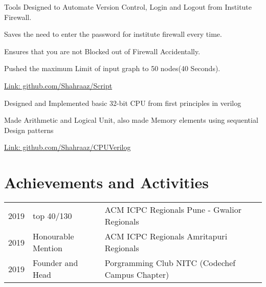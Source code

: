 \documentclass[]{deedy-resume-openfont}
\begin{document}
\begin{minipage}[t]{0.66\textwidth}
\vspace{\topsep} %
\begin{tightemize}
\item Tools Designed to Automate Version Control, Login and Logout from Institute Firewall.
\item Saves the need to enter the password for institute firewall every time.
\item Ensures that you are not Blocked out of Firewall Accidentally.
\item Pushed the maximum Limit of input graph to 50 nodes(40 Seconds).
\item \href{https://github.com/Shahraaz/Script}{Link: github.com/Shahraaz/Script}
\end{tightemize}
\sectionsep

\vspace{\topsep} %
\begin{tightemize}
\item Designed and Implemented basic 32-bit CPU from first principles in verilog
\item Made Arithmetic and Logical Unit, also made Memory elements using
sequential Design patterns
\item \href{https://github.com/Shahraaz/CPUVerilog}{Link: github.com/Shahraaz/CPUVerilog}
\end{tightemize}
\sectionsep


\section{Achievements and Activities} 
\begin{tabular}{rll}
2019	     & top 40/130  & ACM ICPC Regionals Pune - Gwalior Regionals\\
2019	     & Honourable Mention  & ACM ICPC Regionals Amritapuri Regionals\\
2019	     & Founder and Head  & Porgramming Club NITC (Codechef Campus Chapter)\\
\end{tabular}
\sectionsep

\end{minipage} 
\end{document}
